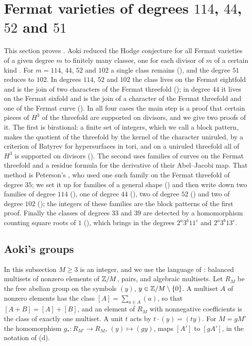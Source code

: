 \section{Fermat varieties of degrees \texorpdfstring{$114$}{114},
\texorpdfstring{$44$}{44}, \texorpdfstring{$52$}{52} and
\texorpdfstring{$51$}{51}}\label{sec:fermat114}

This section proves . Aoki reduced the Hodge
conjecture for all Fermat varieties of a given degree $m$ to finitely many
classes, one for each divisor of $m$ of a certain kind
\cite{Aok83,Aok00}. For $m=114$, $44$, $52$ and $102$ a single class
remains (), and the degree $51$ reduces to $102$. In
degrees $114$, $52$ and $102$ the class lives on the Fermat eightfold and is
the join of two characters of the Fermat threefold
(); in degree $44$ it lives
on the Fermat sixfold and is the join of a character of the Fermat threefold
and one of the Fermat curve (). In all four cases the
main step is a proof that certain pieces of $H^{3}$ of the threefold are
supported on divisors, and we give two proofs of it. The first is
birational: a finite set of integers, which we call a block pattern, makes
the quotient of the threefold by the kernel of the character uniruled, by a
criterion of Batyrev for hypersurfaces in tori, and on a uniruled threefold
all of $H^{3}$ is supported on divisors (). The second
uses families of curves on the Fermat threefold and a residue formula for
the derivative of their Abel--Jacobi map. That method is Peterson's
\cite[\S3]{Pet26}, who used one such family on the Fermat threefold of
degree $35$; we set it up for families of a general shape
() and then write down two families of degree $114$
(), one of degree $44$ (), two
of degree $52$ () and two of degree $102$
(); the integers of these families are the block
patterns of the first proof. Finally the classes of degrees $33$ and $39$
are detected by a homomorphism counting square roots of $1$
(), which brings in the degrees $2^{a}3^{b}11^{c}$ and
$2^{a}3^{b}13^{c}$.

\subsection{Aoki's groups}\label{ssec:aokigroups}
In this subsection $M\ge3$ is an integer, and we use the language of
: balanced multisets of nonzero elements of $\mathbb{Z}/M$,
pairs, and algebraic multisets. Let $R_{M}$ be the free abelian group on the
symbols $(y)$, $y\in\mathbb{Z}/M\setminus\{0\}$. A multiset $A$ of nonzero elements
has the class $[A]=\sum_{a\in A}(a)$, so that $[A+B]=[A]+[B]$, and an element
of $R_{M}$ with nonnegative coefficients is the class of exactly one
multiset. A unit $t$ acts by $t\cdot(y)=(ty)$. For $M=gM'$ the homomorphism
$g_{*}\colon R_{M'}\to R_{M}$, $(y)\mapsto(gy)$, maps $[A']$ to $[gA']$, in
the notation of (d).

